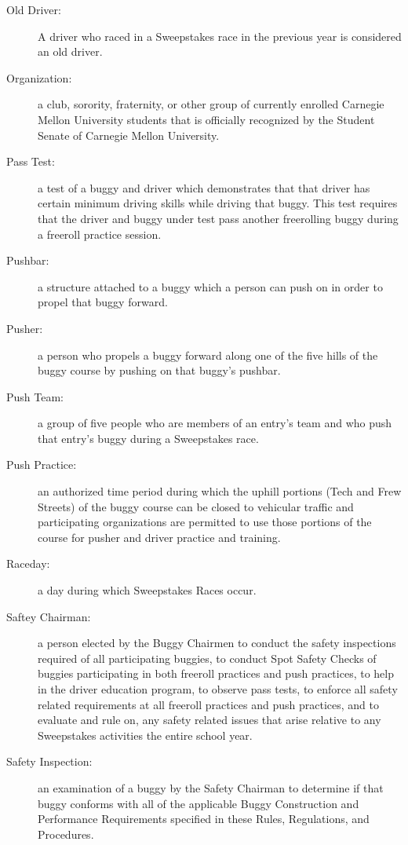 \begin{description}
    \item [Old Driver:] 
	A driver who raced in a Sweepstakes race in the previous year is considered an old driver.

	\item[Organization:]
	a club, sorority, fraternity, or other group of currently enrolled Carnegie Mellon University students that is officially recognized by the Student Senate of Carnegie Mellon University.

	\item[Pass Test:]
	a test of a buggy and driver which demonstrates that that driver has certain minimum driving skills while driving that buggy. This test requires that the driver and buggy under test pass another freerolling buggy during a freeroll practice session.

	\item[Pushbar:]
	a structure attached to a buggy which a person can push on in order to propel that buggy forward. 

	\item[Pusher:]
	a person who propels a buggy forward along one of the five hills of the buggy course by pushing on that buggy's pushbar.

	\item[Push Team:]
	a group of five people who are members of an entry's team and who push that entry's buggy during a Sweepstakes race.

	\item[Push Practice:]
	an authorized time period during which the uphill portions (Tech and Frew Streets) of the buggy course can be closed to vehicular traffic and participating organizations are permitted to use those portions of the course for pusher and driver practice and training.

	\item[Raceday:]
	a day during which Sweepstakes Races occur.

	\item[Saftey Chairman:]
	a person elected by the Buggy Chairmen to conduct the safety inspections required of all participating buggies, to conduct Spot Safety Checks of buggies participating in both freeroll practices and push practices, to help in the driver education program, to observe pass tests, to enforce all safety related requirements at all freeroll practices and push practices, and to evaluate and rule on, any safety related issues that arise relative to any Sweepstakes activities the entire school year.

	\item[Safety Inspection:]
	an examination of a buggy by the Safety Chairman to determine if that buggy conforms with all of the applicable Buggy Construction and Performance Requirements specified in these Rules, Regulations, and Procedures.


\end{description}
